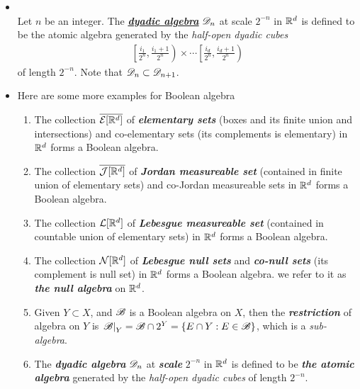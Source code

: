 \documentclass[11pt]{article}
\begin{document}
\begin{itemize}
\item \begin{definition} \citep{tao2011introduction}\\
Let $n$ be an integer. The \underline{\emph{\textbf{dyadic algebra}}} ${\mathscr D}_{n}$ at scale $2^{-n}$ in ${\mathbb R}^d$ is defined to be the atomic algebra generated by the \emph{half-open dyadic cubes}
\begin{align*}
\left[\frac{i_{1}}{2^{n}}, \frac{i_{1}+1}{2^{n}}\right) \times \cdots  \left[\frac{i_{d}}{2^{n}}, \frac{i_{d}+1}{2^{n}}\right)
\end{align*} of length $2^{-n}$. Note that ${\mathscr D}_{n}\subset {\mathscr D}_{n+1}$. 
\end{definition}

\item 
\begin{example} Here are some more examples for Boolean algebra \citep{tao2011introduction}
\begin{enumerate}
\item The collection $\overline{{\mathcal E}[{\mathbb R}^{d}]}$ of \emph{\textbf{elementary sets}} (boxes and its finite union and intersections) and co-elementary sets (its complements is elementary) in ${\mathbb R}^{d}$ forms a Boolean algebra.

\item The collection $\overline{\mathcal{J}[{\mathbb R}^{d}]}$ of \emph{\textbf{Jordan measureable set}} (contained in finite union of elementary sets) and co-Jordan measureable sets in ${\mathbb R}^{d}$ forms a Boolean algebra.

\item The collection ${\mathcal L}[{\mathbb R}^{d}]$  of \emph{\textbf{Lebesgue measureable set}}  (contained in countable union of elementary sets) in ${\mathbb R}^{d}$ forms a Boolean algebra.

\item The collection ${\mathcal N}[{\mathbb R}^{d}]$ of \emph{\textbf{Lebesgue null sets}} and \emph{\textbf{co-null sets}} (its complement is null set) in ${\mathbb R}^{d}$ forms a Boolean algebra. we refer to it as \emph{\textbf{the null algebra}} on ${\mathbb R}^d$.

\item  Given $Y\subset X$, and ${\mathscr B}$ is a Boolean algebra on $X$, then the \emph{\textbf{restriction}} of algebra on $Y$ is 
$\left.{{\mathscr B}}\right\vert_{Y} = {\mathscr B} \cap 2^Y = \left\{E\cap Y: E\in {\mathscr B}\right\}$, which is a \emph{sub-algebra}.

\item  The \emph{\textbf{dyadic algebra}} ${\mathscr D}_{n}$ at \textbf{\emph{scale}} $2^{-n}$ in ${\mathbb R}^d$ is defined to be \emph{\textbf{the atomic algebra}} generated by the \emph{half-open dyadic cubes}  of length $2^{-n}$.




\end{enumerate}
\end{example}
\end{itemize}
\end{document}
